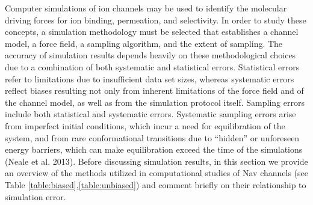 \begin{refsection}
 Computer simulations of ion channels may be used to identify the molecular driving forces for ion binding, permeation, and selectivity.  In order to study these concepts, a simulation methodology must be selected that establishes a channel model, a force field, a sampling algorithm, and the extent of sampling.  The accuracy of simulation results depends heavily on these methodological choices due to a combination of both systematic and statistical errors.  Statistical errors refer to limitations due to insufficient data set sizes, whereas systematic errors reflect biases resulting not only from inherent limitations of the force field and of the channel model, as well as from the simulation protocol itself.  Sampling errors include both statistical and systematic errors.  Systematic sampling errors arise from imperfect initial conditions, which incur a need for equilibration of the system, and from rare conformational transitions due to ``hidden'' or unforeseen energy barriers, which can make equilibration exceed the time of the simulations (Neale et al. 2013).  Before discussing simulation results, in this section we provide an overview of the methods utilized in computational studies of Nav channels (see Table \ref{table:biased},\ref{table:unbiased}) and comment briefly on their relationship to simulation error.
 

\end{refsection}
